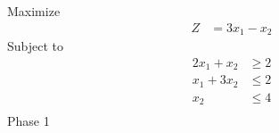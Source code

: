 \documentclass[12pt]{article}
\begin{document}
Maximize
\begin{align*}
Z              & = 3x_{1}-x_{2}
\end{align*}
Subject to
\begin{align*}
2x_{1}+x_{2}   & \ge 2                                                                                                                                                         \\
x_{1}+3x_{2}   & \le 2                                                                                                                                                         \\
x_{2}          & \le 4                                                                                                                                                         \\
\end{align*}
Phase 1                                                                                                                                                                        \\[5pt]
\end{document}
